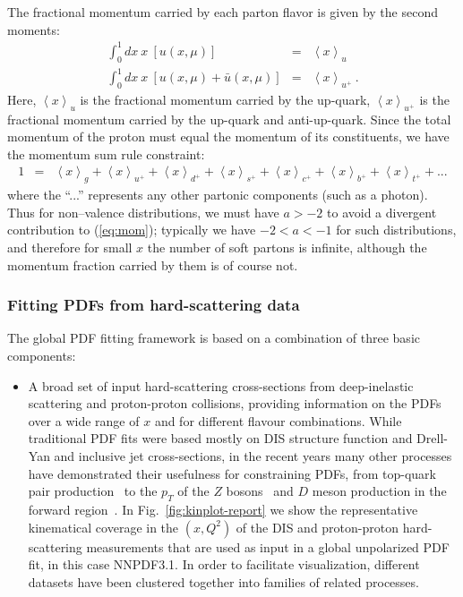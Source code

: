 The fractional momentum carried
by each parton flavor is given by the second moments: 
%
\begin{eqnarray}
\int_{0}^{1}dx\ x\ \left[u(x,\mu)\right] & = & \left\langle x\right\rangle _{u}\\
\int_{0}^{1}dx\ x\ \left[u(x,\mu)+\bar{u}(x,\mu)\right] & = & \left\langle x\right\rangle _{u^{+}}\ .
\end{eqnarray}
%
Here, $\left\langle x\right\rangle _{u}$ is the fractional momentum
carried by the up-quark, $\left\langle x\right\rangle _{u^{+}}$ is
the fractional momentum carried by the up-quark and anti-up-quark.
Since the total momentum of the proton must equal the momentum of
its constituents, we have the momentum sum rule constraint: 
%
\begin{eqnarray}\label{eq:mom}
1 & = & \left\langle x\right\rangle _{g}+\left\langle x\right\rangle _{u^{+}}+\left\langle x\right\rangle _{d^{+}}+\left\langle x\right\rangle _{s^{+}}+\left\langle x\right\rangle _{c^{+}}+\left\langle x\right\rangle _{b^{+}}+\left\langle x\right\rangle _{t^{+}}+...
\end{eqnarray}
%
where the ``...'' represents any other partonic components (such
as a photon). Thus for non--valence distributions, we must have $a>-2$ to avoid a divergent contribution to (\ref{eq:mom}); typically we have $-2<a<-1$ for such distributions, and therefore for small $x$ the number of soft partons is infinite, although the momentum fraction carried by them is of course not.

\subsubsection*{Fitting PDFs from hard-scattering data}

The global PDF fitting framework is based on a combination of three basic components:
\begin{itemize}
\item A broad set of input hard-scattering cross-sections from deep-inelastic
  scattering and proton-proton collisions, providing information on the PDFs
  over a wide range of $x$ and for different flavour combinations.
  While traditional PDF fits were based mostly on DIS structure function and Drell-Yan
  and inclusive jet
  cross-sections, in the recent years many other processes have demonstrated
  their usefulness for constraining PDFs, from top-quark pair production~\cite{Czakon:2016olj}
  to the $p_T$ of the $Z$ bosons~\cite{Boughezal:2017nla}
  and $D$ meson production in the forward region~\cite{Gauld:2016kpd}.
  In Fig.~\ref{fig:kinplot-report} we show the representative kinematical coverage in the
    $(x,Q^2)$ of the DIS and proton-proton hard-scattering measurements that are
    used as input in a global unpolarized PDF fit, in this case NNPDF3.1.
    In order to facilitate visualization, different
    datasets have been clustered together into families of
    related processes.
  
  \end{itemize}




